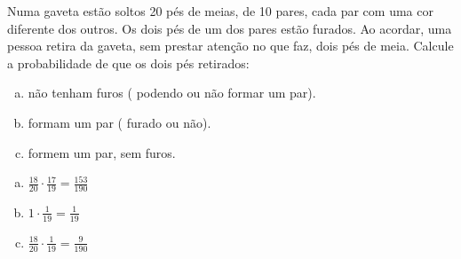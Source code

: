 \begin{ex}
Numa gaveta estão soltos 20 pés de meias, de 10 pares, cada par com uma cor diferente dos outros. Os dois pés de um dos pares estão furados. Ao acordar, uma pessoa retira da gaveta, sem prestar atenção no que faz, dois pés de meia. Calcule a probabilidade de que os dois pés retirados:
   \begin{enumerate}[(a)]
   \item não tenham furos ( podendo ou não formar um par).
   \item formam um par ( furado ou não).
   \item formem um par, sem furos.
   \end{enumerate}
     \begin{sol}
      \phantom{A}
      \begin{enumerate} [(a)]
          \item $\frac{18}{20}\cdot\frac{17}{19}=\frac{153}{190}$
          \item $1\cdot\frac{1}{19}=\frac{1}{19}$
          \item $\frac{18}{20}\cdot\frac{1}{19}=\frac{9}{190}$
      \end{enumerate}
     \end{sol}
   
\end{ex}